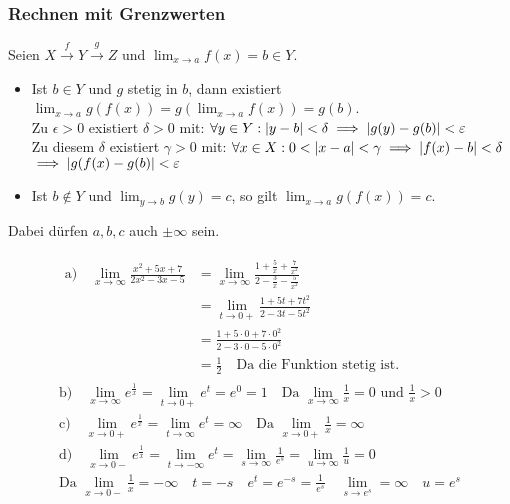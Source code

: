 \subsubsection{Rechnen mit Grenzwerten}
Seien $X \xrightarrow{f} Y \xrightarrow{g} Z$ und  $\lim_{x \rightarrow a} f(x) = b \in Y$.\\
\begin{itemize}
	\item Ist $b \in Y$ und $g$ stetig in $b$, dann existiert $\lim_{x \rightarrow a} g(f(x)) = g(\lim_{x \rightarrow a} f(x)) = g(b)$. \\
		Zu $\epsilon > 0$ existiert $\delta > 0$ mit: $\forall y \in Y : \abs{y-b} < \delta \implies \abs{g(y)-g(b)} < \epsilon$ \\
		Zu diesem $\delta$ existiert $\gamma > 0$ mit: $\forall x \in X : 0 < \abs{x-a} < \gamma \implies \abs{f(x)-b} < \delta$ \\
		$\implies \abs{g(f(x)-g(b)} < \epsilon$ \\
	\item Ist $b \notin Y$ und $\lim_{y \rightarrow b} g(y) = c$, so gilt $\lim_{x \rightarrow a} g(f(x)) = c$.
\end{itemize}
\begin{bem}
	Dabei dürfen $a, b, c$ auch $\pm \infty$ sein.
\end{bem}
\begin{bsp*}
	\begin{gather*}
		\begin{split}
			\text{a)} \quad \lim_{x \rightarrow \infty} \frac{x^2 + 5x + 7}{2x^2 - 3x - 5} &= \lim_{x \rightarrow \infty} \frac{ 1 + \frac{5}{x} + \frac{7}{x^2}}{2 - \frac{3}{x} - \frac{5}{x^2}} \\
				&= \lim_{t \rightarrow 0+} \frac{1 + 5t + 7t^2}{2 - 3t - 5t^2} \\
				&= \frac{1 + 5 \cdot 0 + 7 \cdot 0^2}{2 - 3 \cdot 0 - 5 \cdot 0^2} \\
				&= \frac{1}{2} \quad \text{Da die Funktion stetig ist.}
		\end{split} \\
		\text{b)} \quad \lim_{x \rightarrow \infty} e^{\frac{1}{x}} = \lim_{t \rightarrow 0+} e^t = e^0 = 1 \quad \text{Da } \lim_{x \rightarrow \infty} \frac{1}{x} = 0 \text{ und } \frac{1}{x} > 0 \\
		\text{c)} \quad \lim_{x \rightarrow 0+} e^{\frac{1}{x}} = \lim_{t \rightarrow \infty} e^t = \infty \quad \text{Da } \lim_{x \rightarrow 0+} \frac{1}{x} = \infty \\
		\text{d)} \quad \lim_{x \rightarrow 0-} e^{\frac{1}{x}} = \lim_{t \rightarrow -\infty} e^t = \lim_{s \rightarrow \infty} \frac{1}{e^s} = \lim_{u \rightarrow \infty} \frac{1}{u} = 0 \\
		\text{Da } \lim_{x \rightarrow 0-} \frac{1}{x} = -\infty \quad t=-s \quad e^t = e^{-s} = \frac{1}{e^s} \quad \lim_{s \rightarrow e^s} = \infty \quad u = e^s
	\end{gather*}
\end{bsp*}
